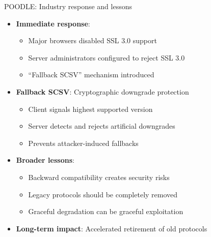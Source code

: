 \documentclass[aspectratio=169, lualatex, handout]{beamer}
\begin{document}
\begin{frame}{POODLE: Industry response and lessons}
	\begin{itemize}[<+->]
		\item \textbf{Immediate response}:
		      \begin{itemize}
			      \item Major browsers disabled SSL 3.0 support
			      \item Server administrators configured to reject SSL 3.0
			      \item ``Fallback SCSV'' mechanism introduced
		      \end{itemize}
		\item \textbf{Fallback SCSV}: Cryptographic downgrade protection
		      \begin{itemize}
			      \item Client signals highest supported version
			      \item Server detects and rejects artificial downgrades
			      \item Prevents attacker-induced fallbacks
		      \end{itemize}
		\item \textbf{Broader lessons}:
		      \begin{itemize}
			      \item Backward compatibility creates security risks
			      \item Legacy protocols should be completely removed
			      \item Graceful degradation can be graceful exploitation
		      \end{itemize}
		\item \textbf{Long-term impact}: Accelerated retirement of old protocols
	\end{itemize}
\end{frame}
\end{document}

